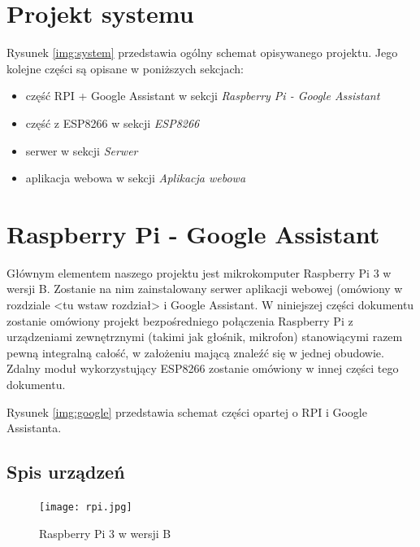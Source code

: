 \section{Projekt systemu}
\begin{center}
	\label{img:system}
\end{center}
Rysunek \ref{img:system} przedstawia ogólny schemat opisywanego projektu.
Jego kolejne części są opisane w poniższych sekcjach:
\begin{itemize}
\item część RPI + Google Assistant w sekcji \textit{Raspberry Pi - Google Assistant}
\item część z ESP8266 w sekcji \textit{ESP8266}
\item serwer w sekcji \textit{Serwer}
\item aplikacja webowa w sekcji \textit{Aplikacja webowa}
\end{itemize}


\section{Raspberry Pi - Google Assistant}

Głównym elementem naszego projektu jest mikrokomputer Raspberry Pi 3 w wersji B. Zostanie na nim zainstalowany serwer aplikacji webowej (omówiony w rozdziale <tu wstaw rozdział> i Google Assistant. W niniejszej części dokumentu zostanie omówiony projekt bezpośredniego połączenia Raspberry Pi z urządzeniami zewnętrznymi (takimi jak głośnik, mikrofon) stanowiącymi razem pewną integralną całość, w założeniu mającą znaleźć się w jednej obudowie. Zdalny moduł wykorzystujący ESP8266 zostanie omówiony w innej części tego dokumentu.

\begin{center}
	\label{img:google}
\end{center}
Rysunek \ref{img:google} przedstawia schemat części opartej o RPI i Google Assistanta.

\subsection{Spis urządzeń}

	\begin{figure}[H]
	\centering
	\texttt{[image: rpi.jpg]}
	\caption{Raspberry Pi 3 w wersji B}
	\end{figure}
	
